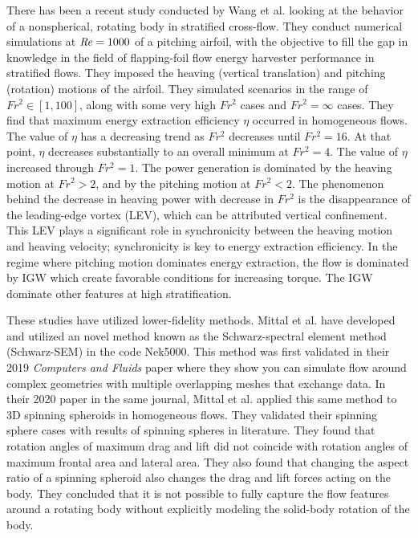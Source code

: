 There has been a recent study conducted by Wang et al. \cite{wang_numerical_2023} looking at the behavior of a nonspherical, rotating body in stratified cross-flow. They conduct numerical simulations at $\mathit{Re} = 1000$ of a pitching airfoil, with the objective to fill the gap in knowledge in the field of flapping-foil flow energy harvester performance in stratified flows. They imposed the heaving (vertical translation) and pitching (rotation) motions of the airfoil. They simulated scenarios in the range of $Fr^2 \in [1, 100]$, along with some very high $Fr^2$ cases and $Fr^2 = \infty$ cases. They find that maximum energy extraction efficiency $\eta$ occurred in homogeneous flows. The value of $\eta$ has a decreasing trend as $Fr^2$ decreases until $Fr^2 = 16$. At that point, $\eta$ decreases substantially to an overall minimum at $Fr^2 = 4$. The value of $\eta$ increased through $Fr^2 = 1$. The power generation is dominated by the heaving motion at $Fr^2 > 2$, and by the pitching motion at $Fr^2 < 2$. The phenomenon behind the decrease in heaving power with decrease in $Fr^2$ is the disappearance of the leading-edge vortex (LEV), which can be attributed vertical confinement. This LEV plays a significant role in synchronicity between the heaving motion and heaving velocity; synchronicity is key to energy extraction efficiency. In the regime where pitching motion dominates energy extraction, the flow is dominated by IGW which create favorable conditions for increasing torque. The IGW dominate other features at high stratification. 

These studies have utilized lower-fidelity methods. Mittal et al. have developed and utilized an novel method known as the Schwarz-spectral element method (Schwarz-SEM) in the code Nek5000. This method was first validated in their 2019 \textit{Computers and Fluids} paper \cite{mittal_nonconforming_2019} where they show you can simulate flow around complex geometries with multiple overlapping meshes that exchange data. In their 2020 paper in the same journal, Mittal et al. applied this same method to 3D spinning spheroids in homogeneous flows. They validated their spinning sphere cases with results of spinning spheres in literature. They found that rotation angles of maximum drag and lift did not coincide with rotation angles of maximum frontal area and lateral area. They also found that changing the aspect ratio of a spinning spheroid also changes the drag and lift forces acting on the body. They concluded that it is not possible to fully capture the flow features around a rotating body without explicitly modeling the solid-body rotation of the body.  

